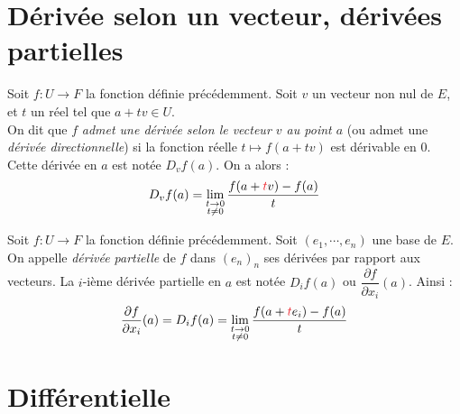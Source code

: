 \documentclass[11pt,a4paper,fleqn,pdftex]{report}
\begin{document}
\section{Dérivée selon un vecteur, dérivées partielles} %
\label{sec:derivee_selon_un_vecteur_derivees_partielles}
\begin{dfn}
     Soit $f:U\to F$ la fonction définie précédemment.\newline
    Soit $v$ un vecteur non nul de $E$, et $t$ un réel tel que $a+tv \in U$. \\
    On dit que $f$ \emph{admet une dérivée selon le vecteur $v$ au point $a$} (ou admet une \emph{dérivée directionnelle}) si la fonction réelle $t\mapsto f(a+tv)$ est dérivable en $0$. Cette dérivée en $a$ est notée $D_vf(a)$. \newline
    On a alors : 
    \begin{equation}
    D_vf(a)=\lim_{\substack{t\rightarrow 0\\ t\neq 0}}\dfrac{f(a+\textcolor{Red}{t}v) - f(a)}{t}
    \end{equation}
\end{dfn}
\begin{dfn}
     Soit $f:U\to F$ la fonction définie précédemment.\newline
     Soit $(e_1, \cdots ,e_n)$ une base de $E$. On appelle \emph{dérivée partielle} de $f$ dans $(e_n)_n$ ses dérivées par rapport aux vecteurs. La $i$-ième dérivée partielle en $a$ est notée $D_if(a)$ ou $\dfrac{\partial f}{\partial x_i}(a)$. Ainsi : 
     \begin{equation}
     \dfrac{\partial f}{\partial x_i}(a)=D_if(a)=\lim_{\substack{t\rightarrow 0\\ t\neq 0}}\dfrac{f(a+\textcolor{Red}{t}e_i) - f(a)}{t}
     \end{equation}
\end{dfn}
\needspace{3cm}
\section{Différentielle} %
\label{sec:differentielle}
\end{document}
